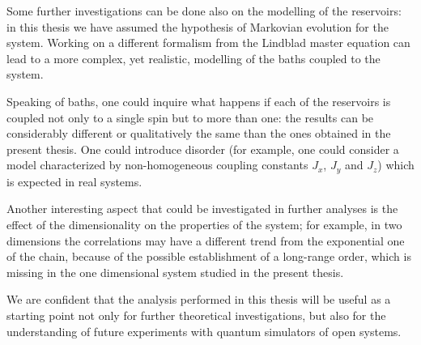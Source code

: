 Some further investigations can be done also on the modelling of the reservoirs:  in this thesis we have assumed the hypothesis of Markovian evolution for the system. Working on a different formalism from the Lindblad master equation can lead to a more complex, yet realistic, modelling of the baths coupled to the system. 

Speaking of baths, one could inquire what happens if each of the reservoirs is coupled not only to a single spin but to more than one: the results can be considerably different or qualitatively the same than the ones obtained in the present thesis. One could introduce disorder (for example, one could consider a model characterized by non-homogeneous coupling constants $J_x$, $J_y$ and $J_z$) which is expected in real systems.

Another interesting aspect that could be investigated in further analyses is the effect of the dimensionality on the properties of the system; for example, in two dimensions the correlations may have a different trend from the exponential one of the chain, because of the possible establishment of a long-range order, which is missing in the one dimensional system studied in the present thesis. 

We are confident that the analysis performed in this thesis will be useful as a starting point not only for further theoretical investigations, but also for the understanding of future experiments with quantum simulators of open systems.



